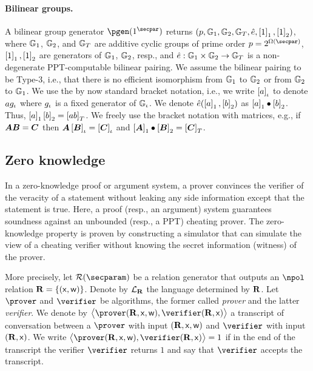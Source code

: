 \documentclass[runningheads]{llncs}
\let\spvec\vec
\let\vec\accentvec
\let\vec\spvec
\def\vec#1{\mathchoice{\mbox{\boldmath$\displaystyle#1$}}
	{\mbox{\boldmath$\textstyle#1$}}
	{\mbox{\boldmath$\scriptstyle#1$}}
	{\mbox{\boldmath$\scriptscriptstyle#1$}}}
\theoremstyle{definition}
\begin{document}
\paragraph{Bilinear groups.}
A bilinear group generator $\pgen (1^\secpar)$ returns $(p, \mathbb{G}_1, \mathbb{G}_2, \mathbb{G}_T, \hat{e}, \left[1\right]_{1}, \left[1\right]_{2})$, where $\mathbb{G}_1$, $\mathbb{G}_2$, and $\mathbb{G}_T$ are additive cyclic groups of prime order $p = 2^{\Omega (\secpar)}$, $\left[1\right]_{1}, \left[1\right]_{2}$ are generators of $\mathbb{G}_1$, $\mathbb{G}_2$, resp., and $\hat{e}: \mathbb{G}_1 \times \mathbb{G}_2 \to \mathbb{G}_T$ is a non-degenerate PPT-computable bilinear pairing.
We assume the bilinear pairing to be Type-3, i.e., that there is no efficient isomorphism from $\mathbb{G}_1$ to $\mathbb{G}_2$ or from $\mathbb{G}_2$ to $\mathbb{G}_1$.
We use the by now standard bracket notation, i.e., we write $\left[a\right]_{\iota}$ to denote $a g_{\iota}$ where $g_{\iota}$ is a fixed generator of $\mathbb{G}_{\iota}$.
We denote $\hat{e} (\left[a\right]_{1}, \left[b\right]_{2})$ as $\left[a\right]_{1} \bullet \left[b\right]_{2}$.
Thus, $\left[a\right]_{1} \left[b\right]_{2} = \left[a b\right]_{T}$.
We freely use the bracket notation with matrices, e.g., if $\vec{A} \vec{B} = \vec{C}$ then $\vec{A} \grpgi{\vec{B}} = \grpgi{\vec{C}}$ and $\gone{\vec{A}}\bullet \gtwo{\vec{B}} = \gtar{\vec{C}}$.

\subsection{Zero knowledge}
In a zero-knowledge proof or argument system, a prover convinces the verifier of the veracity of a statement without leaking any side information except that the statement is true.
Here, a proof (resp., an argument) system guarantees soundness against an unbounded (resp., a PPT) cheating prover.
The zero-knowledge property is proven by constructing a simulator that can simulate the view of a cheating verifier without knowing the secret information (witness) of the prover.

More precisely, let $\RELGEN(\secparam)$ be a relation generator that outputs an $\npol$ relation $\mathbf{R} = \{(\mathsf{x}, \mathsf{w})\}$. Denote by $\mathcal{L}_{\mathbf{R}}$ the language determined by $\mathbf{R}$. 
Let $\prover$ and $\verifier$ be algorithms, the former called \emph{prover} and the latter \emph{verifier}. 
We denote by $\ip{\prover(\REL, \inp, \wit)}{\verifier(\REL, \inp)}$ a transcript of conversation between a $\prover$ with input $(\mathbf{R}, \mathsf{x}, \mathsf{w})$ and $\verifier$ with input $(\mathbf{R}, \mathsf{x})$. 
We write $\ip{\prover (\REL, \inp, \wit)}{\verifier(\REL, \inp)} = 1$ if in the end of the transcript the verifier $\verifier$ returns $1$ and say that $\verifier$ accepts the transcript.
\end{document}
